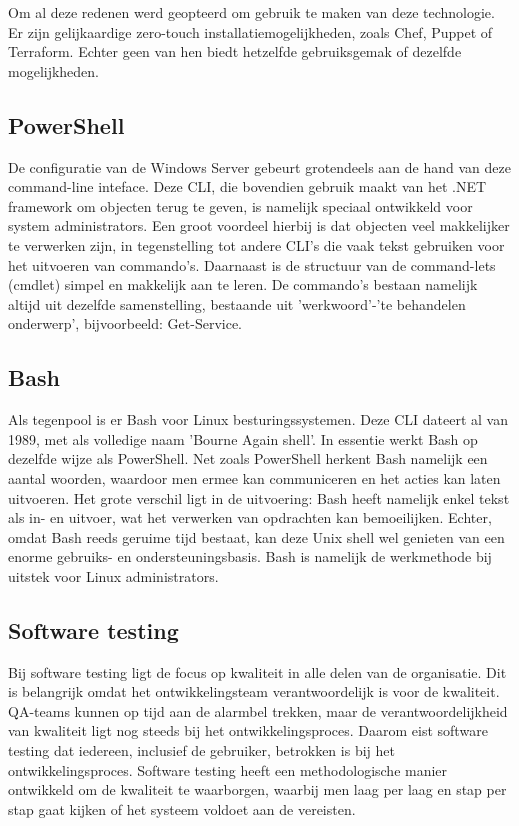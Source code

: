 Om al deze redenen werd geopteerd om gebruik te maken van deze technologie. Er zijn gelijkaardige zero-touch installatiemogelijkheden, zoals Chef, Puppet of Terraform. Echter geen van hen biedt hetzelfde gebruiksgemak of dezelfde mogelijkheden.

\subsection{PowerShell}
De configuratie van de Windows Server gebeurt grotendeels aan de hand van deze command-line inteface. Deze CLI, die bovendien gebruik maakt van het .NET framework om objecten terug te geven, is namelijk speciaal ontwikkeld voor system administrators. Een groot voordeel hierbij is dat objecten veel makkelijker te verwerken zijn, in tegenstelling tot andere CLI’s die vaak tekst gebruiken voor het uitvoeren van commando’s. Daarnaast is de structuur van de command-lets (cmdlet) simpel en makkelijk aan te leren. De commando’s bestaan namelijk altijd uit dezelfde samenstelling, bestaande uit 'werkwoord'-'te behandelen onderwerp', bijvoorbeeld: Get-Service.

\subsection{Bash}
Als tegenpool is er Bash voor Linux besturingssystemen. Deze CLI dateert al van 1989, met als volledige naam 'Bourne Again shell'. In essentie werkt Bash op dezelfde wijze als PowerShell. Net zoals PowerShell herkent Bash namelijk een aantal woorden, waardoor men ermee kan communiceren en het acties kan laten uitvoeren. Het grote verschil ligt in de uitvoering: Bash heeft namelijk enkel tekst als in- en uitvoer, wat het verwerken van opdrachten kan bemoeilijken. Echter, omdat Bash reeds geruime tijd bestaat, kan deze Unix shell wel genieten van een enorme gebruiks- en ondersteuningsbasis. Bash is namelijk de werkmethode bij uitstek voor Linux administrators.


\subsection{Software testing}
\label{sec:testing-uitleg}
Bij software testing ligt de focus op kwaliteit in alle delen van de organisatie. Dit is belangrijk omdat het ontwikkelingsteam verantwoordelijk is voor de kwaliteit. QA-teams kunnen op tijd aan de alarmbel trekken, maar de verantwoordelijkheid van kwaliteit ligt nog steeds bij het ontwikkelingsproces. Daarom eist software testing dat iedereen, inclusief de gebruiker, betrokken is bij het ontwikkelingsproces. Software testing heeft een methodologische manier ontwikkeld om de kwaliteit te waarborgen, waarbij men laag per laag en stap per stap gaat kijken of het systeem voldoet aan de vereisten.


